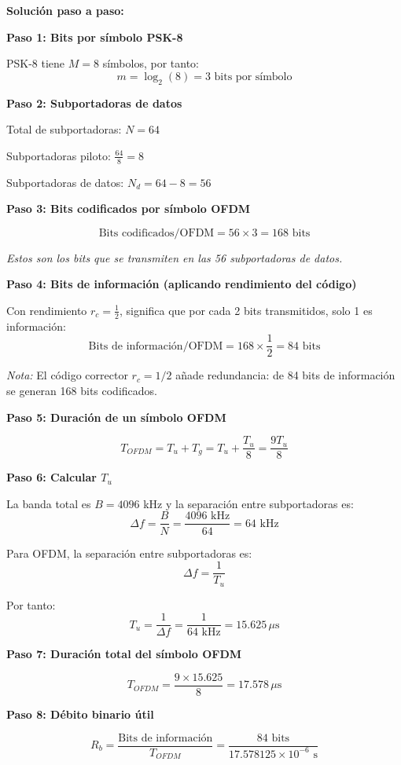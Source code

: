 \documentclass[11pt,a4paper]{article}
\begin{document}
\vspace{0.3cm}
\textbf{Soluci\'on paso a paso:}

\textbf{Paso 1: Bits por s\'imbolo PSK-8}

PSK-8 tiene $M = 8$ s\'imbolos, por tanto:
\[
m = \log_2(8) = 3 \text{ bits por s\'imbolo}
\]

\textbf{Paso 2: Subportadoras de datos}

Total de subportadoras: $N = 64$

Subportadoras piloto: $\frac{64}{8} = 8$

Subportadoras de datos: $N_d = 64 - 8 = 56$

\textbf{Paso 3: Bits codificados por s\'imbolo OFDM}

\[
\text{Bits codificados/OFDM} = 56 \times 3 = 168 \text{ bits}
\]

\textit{Estos son los bits que se transmiten en las 56 subportadoras de datos.}

\textbf{Paso 4: Bits de informaci\'on (aplicando rendimiento del c\'odigo)}

Con rendimiento $r_c = \frac{1}{2}$, significa que por cada 2 bits transmitidos, solo 1 es informaci\'on:
\[
\text{Bits de informaci\'on/OFDM} = 168 \times \frac{1}{2} = 84 \text{ bits}
\]

\textit{Nota:} El c\'odigo corrector $r_c = 1/2$ a\~nade redundancia: de 84 bits de informaci\'on se generan 168 bits codificados.

\textbf{Paso 5: Duraci\'on de un s\'imbolo OFDM}

\[
T_{OFDM} = T_u + T_g = T_u + \frac{T_u}{8} = \frac{9T_u}{8}
\]

\textbf{Paso 6: Calcular $T_u$}

La banda total es $B = 4096$ kHz y la separaci\'on entre subportadoras es:
\[
\Delta f = \frac{B}{N} = \frac{4096 \text{ kHz}}{64} = 64 \text{ kHz}
\]

Para OFDM, la separaci\'on entre subportadoras es:
\[
\Delta f = \frac{1}{T_u}
\]

Por tanto:
\[
T_u = \frac{1}{\Delta f} = \frac{1}{64 \text{ kHz}} = 15.625 \, \mu\text{s}
\]

\textbf{Paso 7: Duraci\'on total del s\'imbolo OFDM}

\[
T_{OFDM} = \frac{9 \times 15.625}{8} = 17.578 \, \mu\text{s}
\]

\textbf{Paso 8: D\'ebito binario \'util}

\[
R_b = \frac{\text{Bits de informaci\'on}}{T_{OFDM}} = \frac{84 \text{ bits}}{17.578125 \times 10^{-6} \text{ s}}
\]
\end{document}
